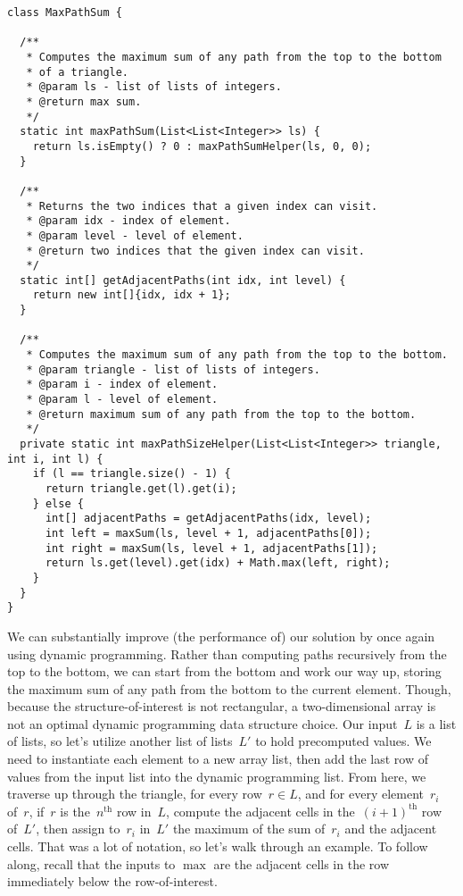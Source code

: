 \begin{lstlisting}[language=MyJava]
class MaxPathSum {

  /**
   * Computes the maximum sum of any path from the top to the bottom
   * of a triangle.
   * @param ls - list of lists of integers. 
   * @return max sum.
   */
  static int maxPathSum(List<List<Integer>> ls) {
    return ls.isEmpty() ? 0 : maxPathSumHelper(ls, 0, 0);
  }

  /**
   * Returns the two indices that a given index can visit.
   * @param idx - index of element.
   * @param level - level of element.
   * @return two indices that the given index can visit.
   */
  static int[] getAdjacentPaths(int idx, int level) {
    return new int[]{idx, idx + 1};
  }

  /**
   * Computes the maximum sum of any path from the top to the bottom.
   * @param triangle - list of lists of integers.
   * @param i - index of element.
   * @param l - level of element.
   * @return maximum sum of any path from the top to the bottom.
   */
  private static int maxPathSizeHelper(List<List<Integer>> triangle, int i, int l) {
    if (l == triangle.size() - 1) {
      return triangle.get(l).get(i);
    } else {
      int[] adjacentPaths = getAdjacentPaths(idx, level);
      int left = maxSum(ls, level + 1, adjacentPaths[0]);
      int right = maxSum(ls, level + 1, adjacentPaths[1]);
      return ls.get(level).get(idx) + Math.max(left, right);
    }
  }
}
\end{lstlisting}

We can substantially improve (the performance of) our solution by once again using dynamic programming.
Rather than computing paths recursively from the top to the bottom, we can start from the bottom and work our way up, storing the maximum sum of any path from the bottom to the current element.
Though, because the structure-of-interest is not rectangular, a two-dimensional array is not an optimal dynamic programming data structure choice.
Our input~$L$ is a list of lists, so let's utilize another list of lists~$L'$ to hold precomputed values.
We need to instantiate each element to a new array list, then add the last row of values from the input list into the dynamic programming list. 
From here, we traverse up through the triangle, for every row~$r\in{L}$, and for every element~$r_i$ of~$r$, if~$r$ is the~$n^\text{th}$ row in~$L$, compute the adjacent cells in the~$(i+1)^\text{th}$ row of~$L'$, then assign to~$r_i$ in~$L'$ the maximum of the sum of~$r_i$ and the adjacent cells.
That was a lot of notation, so let's walk through an example. To follow along, recall that the inputs to $\max$ are the adjacent cells in the row immediately below the row-of-interest.

